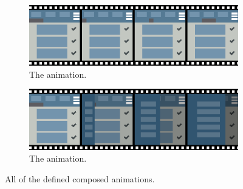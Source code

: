 \begin{figure}[!htbp]
\centering

\begin{subfigure}[h]{\textwidth}
\centering
\includegraphics[width=\figscale\textwidth]{pictures/selectBtn2AnimFig}
\caption{The  animation.}
\label{fig:composed1}
\end{subfigure}

\begin{subfigure}[h]{\textwidth}
\centering
\includegraphics[width=\figscale\textwidth]{pictures/menuIntroFig}
\caption{The  animation.}
\label{fig:composed2}
\end{subfigure}

\caption{All of the defined composed animations.}
\label{fig:composed}
\end{figure}
